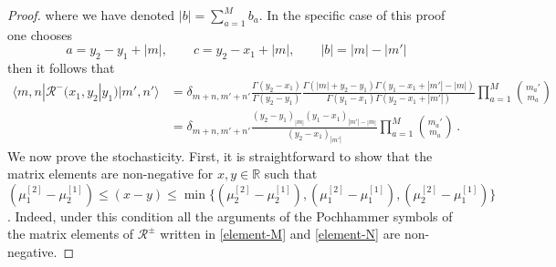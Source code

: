 \documentclass[11pt]{article}
\numberwithin{equation}{section}
\newcommand{\M}{M}
\newcommand{\eR}{\mathcal{R}}
\begin{document}
\begin{proof}
where we have denoted $|b|=\sum_{a=1}^{\M}b_{a}$. In the specific case of this proof one chooses 
\begin{equation}
	a=y_2-y_1+|m|,\qquad c=y_{2}-x_{1}+|m|,\qquad |b|=|m|-|m'|\,
\end{equation}
then it follows that
\begin{equation}
	\begin{split}
		\langle m, n|{\eR}^{-}(x_{1},y_{2}|y_{1})|m',n'\rangle
		&=
		\delta_{m+n,m'+n'}\frac{\Gamma(y_{2}-x_{1})}{\Gamma(y_{2}-y_{1})}\frac{\Gamma(|m|+y_{2}-y_{1})\Gamma(y_{1}-x_{1}+|m'|-|m|)}{\Gamma(y_{1}-x_{1})\Gamma(y_{2}-x_{1}+|m'|)}\prod_{a=1}^{\M}\binom{m_{a}{'}}{m_{a}}
		\\&=
		\delta_{m+n,m'+n'}\frac{\left(y_{2}-y_{1}\right)_{|m|}\left(y_{1}-x_{1}\right)_{|m'|-|m|}}{\left(y_{2}-x_{1}\right)_{|m'|}}\prod_{a=1}^{\M}\binom{m_{a}{'}}{m_{a}}\,.
		\end{split}
	\end{equation}
    We now prove the stochasticity. First, it is straightforward to show that the matrix elements are non-negative for $x,y\in \mathbb{R}$ such that  $(\mu_{1}^{[2]}-\mu_{2}^{[1]})\leq (x-y)\leq \min\{(\mu_{2}^{[2]}-\mu_{2}^{[1]}),(\mu_{1}^{[2]}-\mu_{1}^{[1]}),(\mu_{2}^{[2]}-\mu_{1}^{[1]})\}$. Indeed, under this condition all the arguments of the Pochhammer symbols of the matrix elements of $\eR^{\pm}$ written in \eqref{element-M} and \eqref{element-N} are non-negative.


\end{proof}
\end{document}
